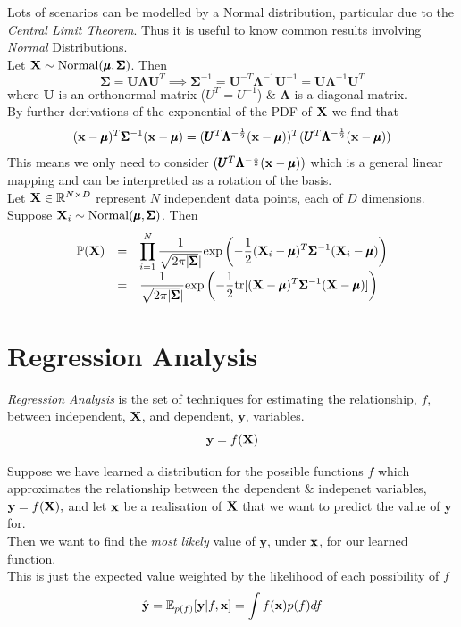\documentclass[11pt,a4paper]{article}
\begin{document}
Lots of scenarios can be modelled by a Normal distribution, particular due to the \textit{Central Limit Theorem}. Thus it is useful to know common results involving \textit{Normal} Distributions.\\

Let $\textbf{X}\sim\text{Normal}(\pmb\mu,\pmb\Sigma)$. Then
$$\pmb\Sigma=\pmb{U}\pmb\Lambda\pmb{U}^T\implies\pmb\Sigma^{-1}=\pmb{U}^{-T}\pmb\Lambda^{-1}\pmb{U}^{-1}=\pmb{U}\pmb\Lambda^{-1}\pmb{U}^T$$
where $\pmb{U}$ is an orthonormal matrix (\ie $U^T=U^{-1}$) \& $\pmb\Lambda$ is a diagonal matrix.\\
By further derivations of the exponential of the PDF of $\textbf{X}$ we find that
$$(\textbf{x}-\pmb\mu)^T\pmb\Sigma^{-1}(\textbf{x}-\pmb\mu)=(\pmb{U}^T\pmb\Lambda^{-\frac{1}{2}}(\textbf{x}-\pmb\mu))^T(\pmb{U}^T\pmb\Lambda^{-\frac{1}{2}}(\textbf{x}-\pmb\mu))$$
This means we only need to consider $(\pmb{U}^T\pmb\Lambda^{-\frac{1}{2}}(\textbf{x}-\pmb\mu))$ which is a general linear mapping and can be interpretted as a rotation of the basis.\\

Let $\textbf{X}\in\mathbb{R}^{N\times D}$ represent $N$ independent data points, each of $D$ dimensions.\\
Suppose $\textbf{X}_i\sim\text{Normal}(\pmb\mu,\pmb\Sigma)$. Then
\[\begin{array}{rcl}
\mathbb{P}(\textbf{X})&=&{\displaystyle\prod_{i=1}^N\dfrac{1}{\sqrt{2\pi|\pmb\Sigma}|}\text{exp}\left(-\frac{1}{2}(\textbf{X}_i-\pmb\mu)^T\pmb\Sigma^{-1}(\textbf{X}_i-\pmb\mu)\right)}\\
&=&{\displaystyle\dfrac{1}{\sqrt{2\pi|\pmb\Sigma}|}\text{exp}\left(-\frac{1}{2}\text{tr}[(\textbf{X}-\pmb\mu)^T\pmb\Sigma^{-1}(\textbf{X}-\pmb\mu)]\right)}\\
\end{array}\]

\section{Regression Analysis}

\textit{Regression Analysis} is the set of techniques for estimating the relationship, $f$, between independent, $\textbf{X}$, and dependent, $\textbf{y}$, variables.
$$\textbf{y}=f(\textbf{X})$$

Suppose we have learned a distribution for the possible functions $f$ which approximates the relationship between the dependent \& indepenet variables, $\textbf{y}=f(\textbf{X}),$ and let $\textbf{x}$ be a realisation of $\textbf{X}$ that we want to predict the value of $\textbf{y}$ for.\\
Then we want to find the \textit{most likely} value of $\textbf{y}$, under $\textbf{x}$, for our learned function.\\
This is just the expected value weighted by the likelihood of each possibility of $f$
$$\hat{\textbf{y}}=\mathbb{E}_{p(f)}[\textbf{y}|f,\textbf{x}]=\int f(\textbf{x})p(f)df$$
\end{document}
